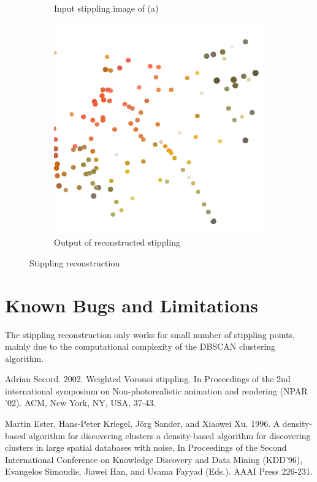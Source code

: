 \documentclass[11pt]{article}
\begin{document}
\begin{figure}[H]
\begin{subfigure}{0.3\textwidth}
 \caption{Input stippling image of (a)}
    \end{subfigure}
    \begin{subfigure}{0.3\textwidth}
        \centering
        \includegraphics[width=\textwidth]{../results/hedcuter/C-1.pdf}
 \caption{Output of reconstructed stippling}
    \end{subfigure}
    \caption{Stippling reconstruction}
    \label{fig:rec}
\end{figure}

\section{Known Bugs and Limitations}

The stippling reconstruction only works for small number of stippling points, mainly due to the computational complexity of the DBSCAN clustering algorithm.


\begin{thebibliography}{9}
Adrian Secord. 2002. Weighted Voronoi stippling. In Proceedings of the 2nd international symposium on Non-photorealistic animation and rendering (NPAR '02). ACM, New York, NY, USA, 37-43.

Martin Ester, Hans-Peter Kriegel, Jörg Sander, and Xiaowei Xu. 1996. A density-based algorithm for discovering clusters a density-based algorithm for discovering clusters in large spatial databases with noise. In Proceedings of the Second International Conference on Knowledge Discovery and Data Mining (KDD'96), Evangelos Simoudis, Jiawei Han, and Usama Fayyad (Eds.). AAAI Press 226-231.

\end{thebibliography}
\end{document}
